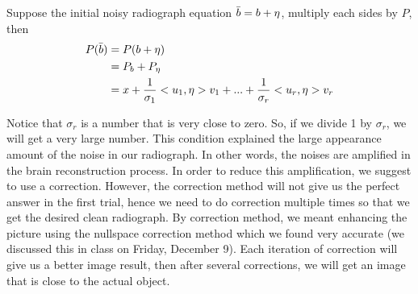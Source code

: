 \documentclass{article}
\begin{document}
Suppose the initial noisy radiograph equation $\Bar{b} = b + \eta$, multiply each sides by $P$, then
\begin{equation}
    \begin{aligned}
        P(\Bar{b}) &=P(b+\eta)\\
                    &= P_b + P_\eta\\ \nonumber
                    &= x+\frac{1}{\sigma_1}<u_1,\eta>v_1+...+\frac{1}{\sigma_r}<u_r,\eta>v_r
    \end{aligned}
\end{equation}

Notice that $\sigma_r$ is a number that is very close to zero. So, if we divide 1 by $\sigma_r$, we will get a very large number. This condition explained the large appearance amount of the noise in our radiograph. In other words, the noises are amplified in the brain reconstruction process. In order to reduce this amplification, we suggest to use a correction. However, the correction method will not give us the perfect answer in the first trial, hence we need to do correction multiple times so that we get the desired clean radiograph. By correction method, we meant enhancing the picture using the nullspace correction method which we found very accurate (we discussed this in class on Friday, December 9). Each iteration of correction will give us a better image result, then after several corrections, we will get an image that is close to the actual object.

\pagebreak
\end{document}
